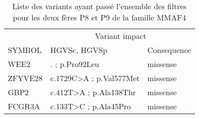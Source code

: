 \documentclass[12pt,twoside]{reedthesis}
\theoremstyle{definition}
\theoremstyle{definition}
\theoremstyle{remark}
\begin{document}
  \begin{longtable}[t]{lll}
  \caption{\label{tab:tabmmaf4}Liste des variants ayant passé l'ensemble des filtres pour les deux fères P8 et P9 de la famille MMAF4}\\
  \toprule
  \multicolumn{1}{c}{ } & \multicolumn{2}{c}{Variant impact} \\
  \cmidrule(l{2pt}r{2pt}){2-3}
  SYMBOL & HGVSc, HGVSp & Consequence\\
  \midrule
  WEE2 & . ; p.Pro92Leu & missense\\
  ZFYVE28 & c.1729C>A ; p.Val577Met & missense\\
  GBP2 & c.412T>A ; p.Ala138Thr & missense\\
  FCGR3A & c.133T>C ; p.Ala45Pro & missense\\
  \bottomrule
  \end{longtable}
  
  \newpage
  
\end{document}
